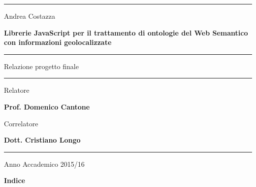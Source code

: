 \documentclass[a4paper,11pt]{article}
\begin{document}
\begin{center}
	\hrule
\end{center}

\vspace*{50pt}

\begin{center}
	\LARGE Andrea Costazza
\end{center}

\vspace*{30pt}

\begin{center}
	\LARGE \textbf{Librerie JavaScript per il trattamento di ontologie del Web Semantico con informazioni geolocalizzate}

\end{center}


\vspace*{80pt}

\noindent\hfil\rule{0.2\textwidth}{.4pt}\hfil

\begin{center}
	\Large Relazione progetto finale
\end{center}

\noindent\hfil\rule{0.2\textwidth}{.4pt}\hfil

\vspace*{180pt}

\begin{flushright}
	\Large Relatore

	\Large \textbf {Prof. Domenico Cantone}
\end{flushright}
\begin{flushright}
	\Large Correlatore

	\Large \textbf {Dott. Cristiano Longo}
\end{flushright}

\bigskip
\bigskip

\hrule

\begin{center}
	\Large Anno Accademico 2015/16
\end{center}
\thispagestyle{empty}
\newpage
\null
\thispagestyle{empty}

\newpage

\LARGE{\textbf{Indice}}
\bigskip
  
\end{document}
